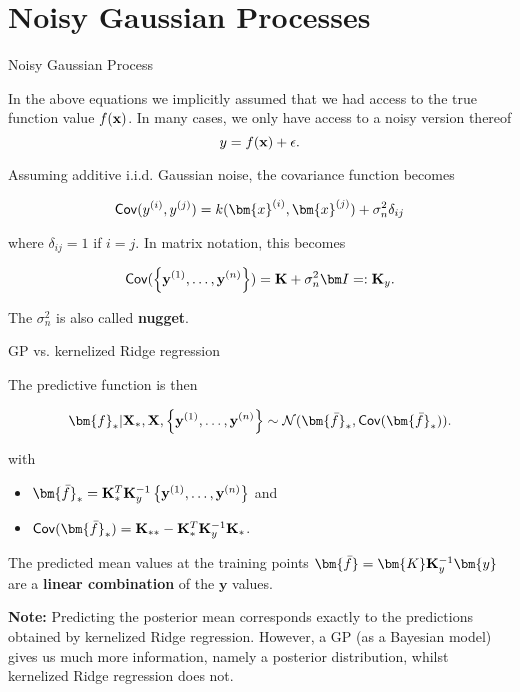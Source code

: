 


\section{Noisy Gaussian Processes}

\begin{vbframe}{Noisy Gaussian Process}

In the above equations we implicitly assumed that we had access to the true function value $f(\mathbf{x})$. In many cases, we only have access to a noisy version thereof 
$$
y = f(\mathbf{x}) + \epsilon.$$ 

Assuming additive i.i.d. Gaussian noise, the covariance function becomes

$$
\cov(y^{(i)}, y^{(j)}) = k(\bm{x}^{(i)}, \bm{x}^{(j)}) + \sigma_n^2 \delta_{ij}
$$

where $\delta_{ij} = 1$ if $i = j$. In matrix notation, this becomes

$$
\cov(\ydat) = \Kmat + \sigma_n^2\id =: \Kmat_y.  
$$

The $\sigma_n^2$ is also called \textbf{nugget}. 

\end{vbframe}

\begin{vbframe}{GP vs. kernelized Ridge regression} 

The predictive function is then 

\begin{eqnarray*}
\bm{f}_* | \Xmat_*, \Xmat, \ydat \sim \mathcal{N}(\bm{\bar f}_*, \cov(\bm{\bar f}_*)).
\end{eqnarray*}

with 

\begin{itemize}
\item $\bm{\bar f}_* = \Kmat_{*}^{T} \Kmat_y^{-1}\ydat$ and
\item $\cov(\bm{\bar f}_*) = \Kmat_{**}- \Kmat_{*}^{T}\Kmat_y^{-1}\Kmat_*$.
\end{itemize}

The predicted mean values at the training points $\bm{\bar f} = \bm{K}\Kmat_y^{-1}\bm{y}$ are a \textbf{linear combination} of the $\bm{y}$ values. 

\lz 

\textbf{Note:} Predicting the posterior mean corresponds exactly to the predictions obtained by kernelized Ridge regression. However, a GP (as a Bayesian model) gives us much more information, namely a posterior distribution, whilst kernelized Ridge regression does not. 


\end{vbframe}




